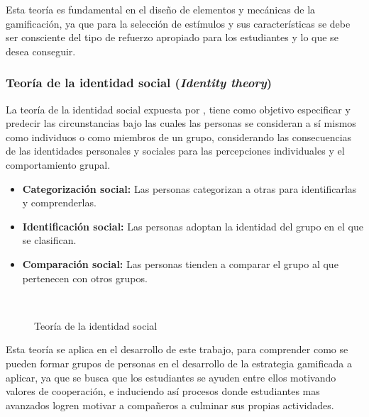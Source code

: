 Esta teoría es fundamental en el diseño de elementos y mecánicas de la gamificación, ya que para la selección 
de estímulos y sus características se debe ser consciente del tipo de refuerzo apropiado para los estudiantes 
y lo que se desea conseguir.


\subsubsection{Teoría de la identidad social (\textit{Identity theory})}

La teoría de la identidad social expuesta por , tiene como objetivo especificar y
predecir las circunstancias bajo las cuales las personas se consideran a sí mismos como individuos o como 
miembros de un grupo, considerando las consecuencias de las identidades personales y sociales para las 
percepciones individuales y el comportamiento grupal.

\begin{itemize}
\item \textbf{Categorización social:} Las personas categorizan a otras para identificarlas y comprenderlas.
\item \textbf{Identificación social:} Las personas adoptan la identidad del grupo en el que se clasifican.
\item \textbf{Comparación social:} Las personas tienden a comparar el grupo al que pertenecen con otros
grupos.
\end{itemize}

\begin{figure}[ht]
\caption{Teoría de la identidad social}
\label{img:TIS}
\centering

\\
{\footnotesize \citeA<basada en>{tajfel1979integrative}}
\end{figure}

Esta teoría se aplica en el desarrollo de este trabajo, para comprender como se pueden formar grupos de 
personas en el desarrollo de la estrategia gamificada a aplicar, ya que se busca que los estudiantes se ayuden
entre ellos motivando valores de cooperación, e induciendo así procesos donde estudiantes mas avanzados logren 
motivar a compañeros a culminar sus propias actividades.

